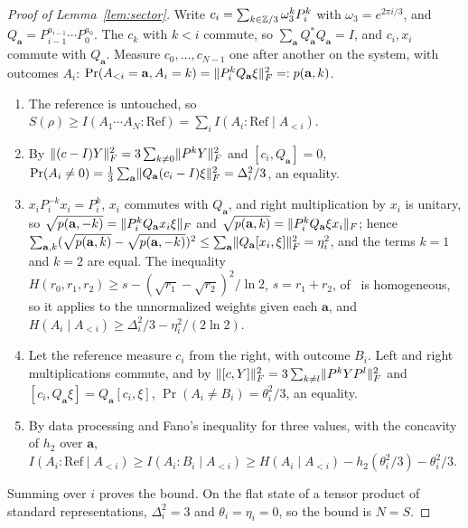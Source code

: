 \begin{proof}[Proof of Lemma~\ref{lem:sector}]
Write $c_i=\sum_{k\in\mathbb Z/3}\omega_3^kP_i^k$ with $\omega_3=e^{2\pi i/3}$, and $Q_{\mathbf a}=P_{i-1}^{a_{i-1}}\cdots P_0^{a_0}$. The $c_k$ with $k<i$ commute, so $\sum_{\mathbf a}Q_{\mathbf a}^*Q_{\mathbf a}=I$,
and $c_i,x_i$ commute with $Q_{\mathbf a}$. Measure $c_0,\dots,c_{N-1}$ one after another on the system, with outcomes $A_i$:
$\Pr(A_{<i}=\mathbf a,A_i=k)=\lVert P_i^kQ_{\mathbf a}\xi\rVert_F^2=:p(\mathbf a,k)$.
\begin{enumerate}[label=\arabic*.,itemsep=1pt]
\item The reference is untouched, so $S(\rho)\ge I(A_1\cdots A_N:\mathrm{Ref})=\sum_iI(A_i:\mathrm{Ref}\mid A_{<i})$.
\item By $\lVert (c-I)Y\rVert_F^2=3\sum_{k\ne0}\lVert P^kY\rVert_F^2$ and $[c_i,Q_{\mathbf a}]=0$, $\Pr(A_i\ne0)=\frac13\sum_{\mathbf a}\lVert Q_{\mathbf a}(c_i-I)\xi\rVert_F^2=\Delta_i^2/3$, an equality.
\item $x_iP_i^{-k}x_i=P_i^k$, $x_i$ commutes with $Q_{\mathbf a}$, and right multiplication by $x_i$ is unitary, so $\sqrt{p(\mathbf a,-k)}=\lVert P_i^kQ_{\mathbf a}x_i\xi\rVert_F$ and
$\sqrt{p(\mathbf a,k)}=\lVert P_i^kQ_{\mathbf a}\xi x_i\rVert_F$; hence $\sum_{\mathbf a,k}(\sqrt{p(\mathbf a,k)}-\sqrt{p(\mathbf a,-k)})^2\le\sum_{\mathbf a}\lVert Q_{\mathbf a}[x_i,\xi]\rVert_F^2=\eta_i^2$, and the terms
$k=1$ and $k=2$ are equal. The inequality $H(r_0,r_1,r_2)\ge s-(\sqrt{r_1}-\sqrt{r_2})^2/\ln2$, $s=r_1+r_2$, of~\cite[equation~(16)]{DouglasMghirbiC} is homogeneous, so it applies to
the unnormalized weights given each $\mathbf a$, and $H(A_i\mid A_{<i})\ge\Delta_i^2/3-\eta_i^2/(2\ln2)$.
\item Let the reference measure $c_i$ from the right, with outcome $B_i$. Left and right multiplications commute, and by $\lVert [c,Y]\rVert_F^2=3\sum_{k\ne l}\lVert P^kYP^l\rVert_F^2$ and
$[c_i,Q_{\mathbf a}\xi]=Q_{\mathbf a}[c_i,\xi]$, $\Pr(A_i\ne B_i)=\theta_i^2/3$, an equality.
\item By data processing and Fano's inequality for three values, with the concavity of $h_2$ over $\mathbf a$,
$I(A_i:\mathrm{Ref}\mid A_{<i})\ge I(A_i:B_i\mid A_{<i})\ge H(A_i\mid A_{<i})-h_2(\theta_i^2/3)-\theta_i^2/3$.
\end{enumerate}
Summing over $i$ proves the bound. On the flat state of a tensor product of standard representations, $\Delta_i^2=3$ and $\theta_i=\eta_i=0$, so the bound is $N=S$.
\end{proof}

